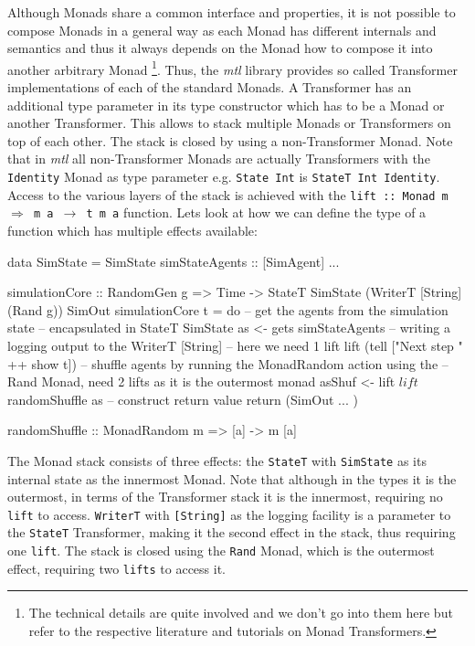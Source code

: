 \medskip

Although Monads share a common interface and properties, it is not possible to compose Monads in a general way as each Monad has different internals and semantics and thus it always depends on the Monad how to compose it into another arbitrary Monad \footnote{The technical details are quite involved and we don't go into them here but refer to the respective literature and tutorials on Monad Transformers.}. Thus, the \textit{mtl} library provides so called Transformer implementations of each of the standard Monads. A Transformer has an additional type parameter in its type constructor which has to be a Monad or another Transformer. This allows to stack multiple Monads or Transformers on top of each other. The stack is closed by using a non-Transformer Monad. Note that in \textit{mtl} all non-Transformer Monads are actually Transformers with the \texttt{Identity} Monad as type parameter e.g. \texttt{State Int} is \texttt{StateT Int Identity}. Access to the various layers of the stack is achieved with the \texttt{lift :: Monad m $\Rightarrow$ m a $\rightarrow$ t m a} function. Lets look at how we can define the type of a function which has multiple effects available:

\begin{HaskellCode}
data SimState = SimState { simStateAgents :: [SimAgent] ... }

simulationCore :: RandomGen g 
               => Time
               -> StateT SimState (WriterT [String] (Rand g)) SimOut
simulationCore t = do
  -- get the agents from the simulation state 
  -- encapsulated in StateT SimState
  as <- gets simStateAgents
  -- writing a logging output to the WriterT [String]
  -- here we need 1 lift 
  lift (tell ["Next step " ++ show t])
  -- shuffle agents by running the MonadRandom action using the
  -- Rand Monad, need 2 lifts as it is the outermost monad
  asShuf <- lift $ lift $ randomShuffle as
  -- construct return value
  return (SimOut { ... })
  
randomShuffle :: MonadRandom m => [a] -> m [a]
\end{HaskellCode}

The Monad stack consists of three effects: the \texttt{StateT} with \texttt{SimState} as its internal state as the innermost Monad. Note that although in the types it is the outermost, in terms of the Transformer stack it is the innermost, requiring no \texttt{lift} to access. \texttt{WriterT} with \texttt{[String]} as the logging facility is a parameter to the \texttt{StateT} Transformer, making it the second effect in the stack, thus requiring one \texttt{lift}. The stack is closed using the \texttt{Rand} Monad, which is the outermost effect, requiring two \texttt{lifts} to access it.

